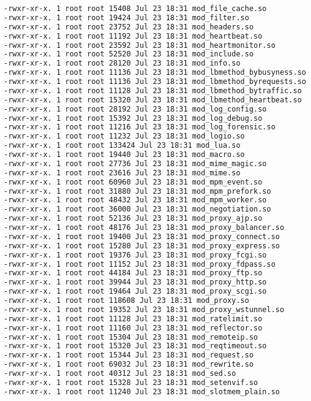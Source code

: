 \begin{lstlisting}[language=bash]
-rwxr-xr-x. 1 root root 15408 Jul 23 18:31 mod_file_cache.so
-rwxr-xr-x. 1 root root 19424 Jul 23 18:31 mod_filter.so
-rwxr-xr-x. 1 root root 23752 Jul 23 18:31 mod_headers.so
-rwxr-xr-x. 1 root root 11192 Jul 23 18:31 mod_heartbeat.so
-rwxr-xr-x. 1 root root 23592 Jul 23 18:31 mod_heartmonitor.so
-rwxr-xr-x. 1 root root 52520 Jul 23 18:31 mod_include.so
-rwxr-xr-x. 1 root root 28120 Jul 23 18:31 mod_info.so
-rwxr-xr-x. 1 root root 11136 Jul 23 18:31 mod_lbmethod_bybusyness.so
-rwxr-xr-x. 1 root root 11136 Jul 23 18:31 mod_lbmethod_byrequests.so
-rwxr-xr-x. 1 root root 11128 Jul 23 18:31 mod_lbmethod_bytraffic.so
-rwxr-xr-x. 1 root root 15320 Jul 23 18:31 mod_lbmethod_heartbeat.so
-rwxr-xr-x. 1 root root 28192 Jul 23 18:31 mod_log_config.so
-rwxr-xr-x. 1 root root 15392 Jul 23 18:31 mod_log_debug.so
-rwxr-xr-x. 1 root root 11216 Jul 23 18:31 mod_log_forensic.so
-rwxr-xr-x. 1 root root 11232 Jul 23 18:31 mod_logio.so
-rwxr-xr-x. 1 root root 133424 Jul 23 18:31 mod_lua.so
-rwxr-xr-x. 1 root root 19440 Jul 23 18:31 mod_macro.so
-rwxr-xr-x. 1 root root 27736 Jul 23 18:31 mod_mime_magic.so
-rwxr-xr-x. 1 root root 23616 Jul 23 18:31 mod_mime.so
-rwxr-xr-x. 1 root root 60960 Jul 23 18:31 mod_mpm_event.so
-rwxr-xr-x. 1 root root 31880 Jul 23 18:31 mod_mpm_prefork.so
-rwxr-xr-x. 1 root root 48432 Jul 23 18:31 mod_mpm_worker.so
-rwxr-xr-x. 1 root root 36000 Jul 23 18:31 mod_negotiation.so
-rwxr-xr-x. 1 root root 52136 Jul 23 18:31 mod_proxy_ajp.so
-rwxr-xr-x. 1 root root 48176 Jul 23 18:31 mod_proxy_balancer.so
-rwxr-xr-x. 1 root root 19400 Jul 23 18:31 mod_proxy_connect.so
-rwxr-xr-x. 1 root root 15280 Jul 23 18:31 mod_proxy_express.so
-rwxr-xr-x. 1 root root 19376 Jul 23 18:31 mod_proxy_fcgi.so
-rwxr-xr-x. 1 root root 11152 Jul 23 18:31 mod_proxy_fdpass.so
-rwxr-xr-x. 1 root root 44184 Jul 23 18:31 mod_proxy_ftp.so
-rwxr-xr-x. 1 root root 39944 Jul 23 18:31 mod_proxy_http.so
-rwxr-xr-x. 1 root root 19464 Jul 23 18:31 mod_proxy_scgi.so
-rwxr-xr-x. 1 root root 118608 Jul 23 18:31 mod_proxy.so
-rwxr-xr-x. 1 root root 19352 Jul 23 18:31 mod_proxy_wstunnel.so
-rwxr-xr-x. 1 root root 11128 Jul 23 18:31 mod_ratelimit.so
-rwxr-xr-x. 1 root root 11160 Jul 23 18:31 mod_reflector.so
-rwxr-xr-x. 1 root root 15304 Jul 23 18:31 mod_remoteip.so
-rwxr-xr-x. 1 root root 15320 Jul 23 18:31 mod_reqtimeout.so
-rwxr-xr-x. 1 root root 15344 Jul 23 18:31 mod_request.so
-rwxr-xr-x. 1 root root 69032 Jul 23 18:31 mod_rewrite.so
-rwxr-xr-x. 1 root root 40312 Jul 23 18:31 mod_sed.so
-rwxr-xr-x. 1 root root 15328 Jul 23 18:31 mod_setenvif.so
-rwxr-xr-x. 1 root root 11240 Jul 23 18:31 mod_slotmem_plain.so

\end{lstlisting}
